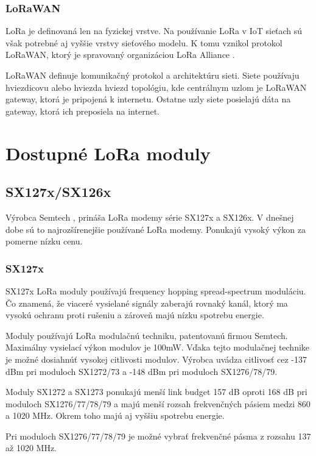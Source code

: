 \documentclass[slovak,master]{diploma}
\begin{document}
\subsection{LoRaWAN}
LoRa je definovaná len na fyzickej vrstve. Na používanie LoRa v IoT sieťach sú však potrebné aj vyššie vrstvy sieťového modelu.
K tomu vznikol protokol LoRaWAN, ktorý je spravovaný organizáciou LoRa Alliance \cite{lora}.

LoRaWAN definuje komunikačný protokol a architektúru sieti. Siete používaju hviezdicovu alebo hviezda hviezd topológiu, kde 
centrálnym uzlom je LoRaWAN gateway, ktorá je pripojená k internetu. Ostatne uzly siete posielajú dáta na gateway, ktorá ich preposiela na internet.

\chapter{Dostupné LoRa moduly }
\section{SX127x/SX126x}
Výrobca Semtech \cite{semtech}, prináša LoRa modemy série SX127x a SX126x. V dnešnej dobe sú to najrozšírenejšie používané LoRa modemy.
Ponukajú vysoký výkon za pomerne nízku cenu.

\subsection{SX127x}

SX127x LoRa moduly používajú frequency hopping spread-spectrum moduláciu. Čo znamená, že viaceré vysielané signály zaberajú rovnaký kanál, ktorý ma 
vysokú ochranu proti rušeniu a zároveň majú nízku spotrebu energie.

Moduly používajú LoRa modulačnú techniku, patentovanú firmou Semtech. Maximálny vysielací výkon modulov je 100mW.
Vďaka tejto modulačnej technike je možné dosiahnúť vysokej citlivosti modulov.
Výrobca uvádza citlivosť cez -137 dBm pri moduloch SX1272/73 a -148 dBm pri moduloch SX1276/78/79.

Moduly SX1272 a SX1273 ponukajú menší link budget 157 dB oproti 168 dB pri moduloch SX1276/77/78/79 a majú menší rozsah frekvenčných pásiem medzi 860 a 1020 MHz.
Okrem toho majú aj vyššiu spotrebu energie.

Pri moduloch SX1276/77/78/79 je možné vybrať frekvenčné pásma z rozsahu 137 až 1020 MHz.
\end{document}
